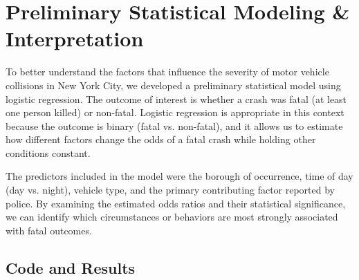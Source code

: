 \documentclass[10pt]{article}\usepackage[]{graphicx}\usepackage[]{xcolor}
\begin{document}
\section{Preliminary Statistical Modeling \& Interpretation}

To better understand the factors that influence the severity of motor vehicle collisions in New York City, we developed a preliminary statistical model using logistic regression. The outcome of interest is whether a crash was fatal (at least one person killed) or non-fatal. Logistic regression is appropriate in this context because the outcome is binary (fatal vs. non-fatal), and it allows us to estimate how different factors change the odds of a fatal crash while holding other conditions constant.

The predictors included in the model were the borough of occurrence, time of day (day vs. night), vehicle type, and the primary contributing factor reported by police. By examining the estimated odds ratios and their statistical significance, we can identify which circumstances or behaviors are most strongly associated with fatal outcomes.

\subsection{Code and Results}
\end{document}
